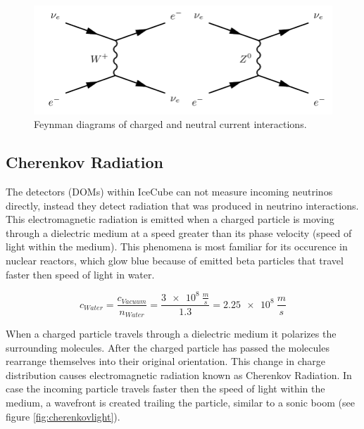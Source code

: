 \documentclass[a4paper,10pt]{scrartcl}
\begin{document}
\begin{figure}[h]
    \includegraphics[scale=0.3]{images/charged-and-neutral-current.png}
    \centering
    \caption{Feynman diagrams of charged and neutral current interactions.}
    \label{fig:cc-nc}
\end{figure}


\subsection{Cherenkov Radiation}

The detectors (DOMs) within IceCube can not measure incoming neutrinos directly, instead they detect radiation that was produced in neutrino interactions.
This electromagnetic radiation is emitted when a charged particle is moving through a dielectric medium at a speed greater than its phase velocity (speed of light within the medium).
This phenomena is most familiar for its occurence in nuclear reactors, which glow blue because of emitted beta particles that travel faster then speed of light in water.

\begin{equation}
    c_{Water} = \frac{c_{Vacuum}}{n_{Water}} = \frac{\SI{3e8}{\frac{m}{s}}}{1.3} = \SI{2.25e8}{\frac{m}{s}}
\end{equation}

When a charged particle travels through a dielectric medium it polarizes the surrounding molecules.
After the charged particle has passed the molecules rearrange themselves into their original orientation.
This change in charge distribution causes electromagnetic radiation known as Cherenkov Radiation.
In case the incoming particle travels faster then the speed of light within the medium, a wavefront is created trailing the particle, similar to a sonic boom (see figure \ref{fig:cherenkovlight}).
\end{document}
